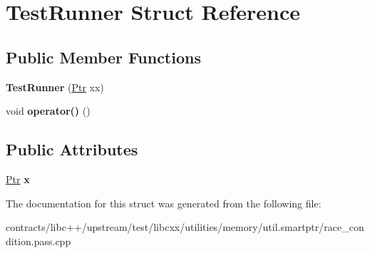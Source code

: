 \hypertarget{struct_test_runner}{}\section{Test\+Runner Struct Reference}
\label{struct_test_runner}
\subsection*{Public Member Functions}
\begin{DoxyCompactItemize}
\item 
\mbox{\label{struct_test_runner_a25e9a829d0f2a064aa77712041345d95}} 
{\bfseries Test\+Runner} (\mbox{\hyperlink{struct_ptr}{Ptr}} xx)
\item 
\mbox{\label{struct_test_runner_a089c481af253b8e96385c8771db7db74}} 
void {\bfseries operator()} ()
\end{DoxyCompactItemize}
\subsection*{Public Attributes}
\begin{DoxyCompactItemize}
\item 
\mbox{\label{struct_test_runner_a192a5a41587a5288e521623cb8291ccc}} 
\mbox{\hyperlink{struct_ptr}{Ptr}} {\bfseries x}
\end{DoxyCompactItemize}


The documentation for this struct was generated from the following file\+:\begin{DoxyCompactItemize}
\item 
contracts/libc++/upstream/test/libcxx/utilities/memory/util.\+smartptr/race\+\_\+condition.\+pass.\+cpp\end{DoxyCompactItemize}
